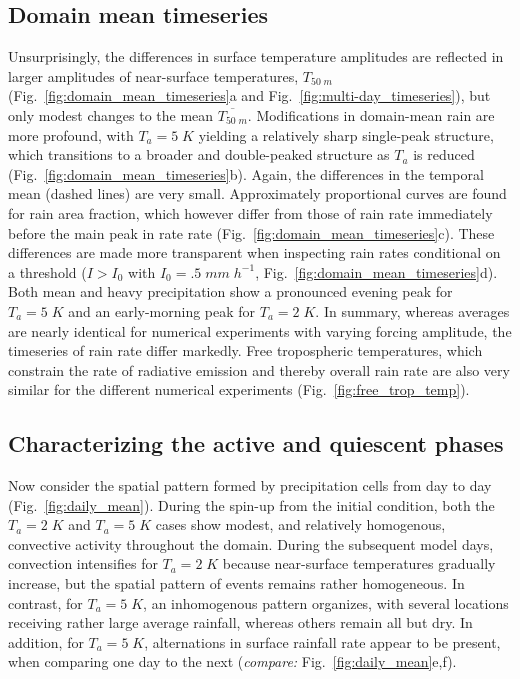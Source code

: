 \documentclass[draft,linenumbers]{agujournal2019}
\begin{document}
\subsection{Domain mean timeseries}
\noindent
Unsurprisingly, the differences in surface temperature amplitudes are reflected in larger amplitudes of near-surface temperatures, $T_{50\;m}$  (Fig.~\ref{fig:domain_mean_timeseries}a and Fig.~\ref{fig:multi-day_timeseries}), but only modest changes to the mean $\overline{T_{50\;m}}$.
Modifications in domain-mean rain are more profound, with $T_a=5\;K$ yielding a relatively sharp single-peak structure, which transitions to a broader and double-peaked structure as $T_a$ is reduced (Fig.~\ref{fig:domain_mean_timeseries}b).
Again, the differences in the temporal mean (dashed lines) are very small.
Approximately proportional curves are found for rain area fraction, which however differ from those of rain rate immediately before the main peak in rate rate (Fig.~\ref{fig:domain_mean_timeseries}c).
These differences are made more transparent when inspecting rain rates conditional on a threshold ($I>I_0$ with $I_0=.5\;mm\;h^{-1}$, Fig.~\ref{fig:domain_mean_timeseries}d). 
Both mean and heavy precipitation show a pronounced evening peak for $T_a=5\;K$ and an early-morning peak for $T_a=2\;K$.
In summary, whereas averages are nearly identical for numerical experiments with varying forcing amplitude, the timeseries of rain rate differ markedly.
Free tropospheric temperatures, which constrain the rate of radiative emission and thereby overall rain rate \cite{Held:2006} are also very similar for the different numerical experiments  (Fig.~\ref{fig:free_trop_temp}).

\subsection{Characterizing the active and quiescent phases}
Now consider the spatial pattern formed by precipitation cells from day to day (Fig.~\ref{fig:daily_mean}). 
During the spin-up from the initial condition, both the $T_a=2\;K$ and $T_a=5\;K$ cases show modest, and relatively homogenous, convective activity throughout the domain. 
During the subsequent model days, convection intensifies for $T_a=2\;K$ because near-surface temperatures gradually increase, but the spatial pattern of events remains rather homogeneous.
In contrast, for $T_a=5\;K$, an inhomogenous pattern organizes, with several locations receiving rather large average rainfall, whereas others remain all but dry. 
In addition, for $T_a=5\;K$, alternations in surface rainfall rate appear to be present, when comparing one day to the next ({\it compare:} Fig.~\ref{fig:daily_mean}e,f).
\end{document}
